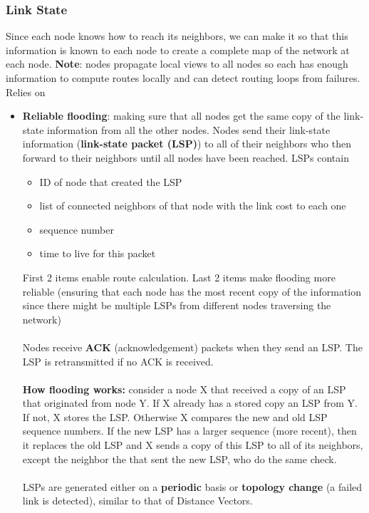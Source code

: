 \documentclass{article}
\begin{document}
  \subsubsection{Link State}
  Since each node knows how to reach its neighbors, we can make it so that this information is known to each node to create a complete map of the network at each node. \textbf{Note}: nodes propagate local views to all nodes so each has enough information to compute routes locally and can detect routing loops from failures. Relies on
  \begin{itemize}
    \item \textbf{Reliable flooding}: making sure that all nodes get the same copy of the link-state information from all the other nodes. Nodes send their link-state information (\textbf{link-state packet (LSP)}) to all of their neighbors who then forward to their neighbors until all nodes have been reached. LSPs contain
      \begin{itemize}
        \item ID of node that created the LSP
        \item list of connected neighbors of that node with the link cost to each one
        \item sequence number
        \item time to live for this packet
      \end{itemize}
      First 2 items enable route calculation. Last 2 items make flooding more reliable (ensuring that each node has the most recent copy of the information since there might be multiple LSPs from different nodes traversing the network) \\ \\
      Nodes receive \textbf{ACK} (acknowledgement) packets when they send an LSP. The LSP is retransmitted if no ACK is received. \\ \\
      \textbf{How flooding works:} consider a node X that received a copy of an LSP that originated from node Y. If X already has a stored copy an LSP from Y. If not, X stores the LSP. Otherwise X compares the new and old LSP sequence numbers. If the new LSP has a larger sequence (more recent), then it replaces the old LSP and X sends a copy of this LSP to all of its neighbors, except the neighbor the that sent the new LSP, who do the same check. \\ \\
      LSPs are generated either on a \textbf{periodic} basis or \textbf{topology change} (a failed link is detected), similar to that of Distance Vectors. \\ \\

\end{itemize}
\end{document}
